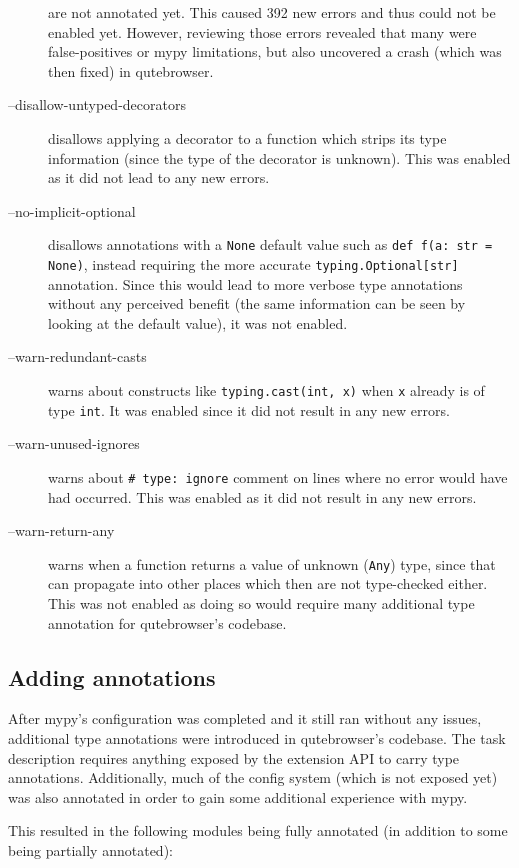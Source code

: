 \documentclass[a4paper,parskip=full]{scrreprt}
\newcommand{\py}[1]{\texttt{#1}}
\begin{document}
\begin{description}
    are not annotated yet. This caused 392 new errors and thus could not be
    enabled yet. However, reviewing those errors revealed that many were
    false-positives or mypy limitations, but also uncovered a crash (which was
    then fixed) in qutebrowser.
  \item[--disallow-untyped-decorators] disallows applying a decorator to a
    function which strips its type information (since the type of the decorator
    is unknown). This was enabled as it did not lead to any new errors.
  \item[--no-implicit-optional] disallows annotations with a \py{None} default
    value such as \py{def f(a: str = None)}, instead requiring the more
    accurate \py{typing.Optional[str]} annotation. Since this would lead to more
    verbose type annotations without any perceived benefit (the same
    information can be seen by looking at the default value), it was not enabled.
  \item[--warn-redundant-casts] warns about constructs like \py{typing.cast(int,
      x)} when \py{x} already is of type \py{int}. It was enabled since it
    did not result in any new errors.
  \item[--warn-unused-ignores] warns about \texttt{# type: ignore}
    comment on lines where no error would have had occurred. This was enabled as
    it did not result in any new errors.
  \item[--warn-return-any] warns when a function returns a value of unknown
    (\verb|Any|) type, since that can propagate into other places which then are
    not type-checked either. This was not enabled as doing so would require many
    additional type annotation for qutebrowser's codebase.
\end{description}

\subsection{Adding annotations}

After mypy's configuration was completed and it still ran without any issues,
additional type annotations were introduced in qutebrowser's codebase. The task
description requires anything exposed by the extension API to carry type
annotations. Additionally, much of the config system (which is not exposed yet)
was also annotated in order to gain some additional experience with mypy.

This resulted in the following modules being fully annotated (in addition to
some being partially annotated):
\end{document}
